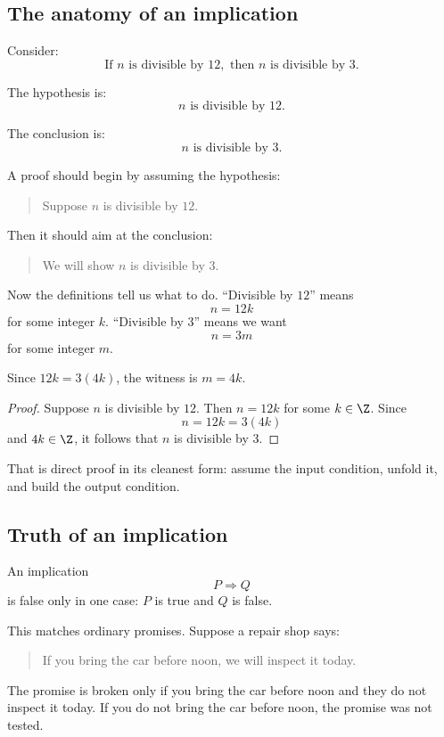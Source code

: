 \subsection{The anatomy of an implication}

Consider:
\[
\text{If }n\text{ is divisible by }12,\text{ then }n\text{ is divisible by }3.
\]

The hypothesis is:
\[
n\text{ is divisible by }12.
\]

The conclusion is:
\[
n\text{ is divisible by }3.
\]

A proof should begin by assuming the hypothesis:

\begin{quote}
Suppose $n$ is divisible by $12$.
\end{quote}

Then it should aim at the conclusion:

\begin{quote}
We will show $n$ is divisible by $3$.
\end{quote}

Now the definitions tell us what to do. ``Divisible by $12$'' means
\[
n=12k
\]
for some integer $k$. ``Divisible by $3$'' means we want
\[
n=3m
\]
for some integer $m$.

Since $12k=3(4k)$, the witness is $m=4k$.

\begin{proof}
Suppose $n$ is divisible by $12$. Then $n=12k$ for some $k\in\Z$. Since
\[
n=12k=3(4k)
\]
and $4k\in\Z$, it follows that $n$ is divisible by $3$.
\end{proof}

That is direct proof in its cleanest form: assume the input condition, unfold it, and build the output condition.

\subsection{Truth of an implication}

An implication
\[
P\Rightarrow Q
\]
is false only in one case: $P$ is true and $Q$ is false.

This matches ordinary promises. Suppose a repair shop says:

\begin{quote}
If you bring the car before noon, we will inspect it today.
\end{quote}

The promise is broken only if you bring the car before noon and they do not inspect it today. If you do not bring the car before noon, the promise was not tested.

